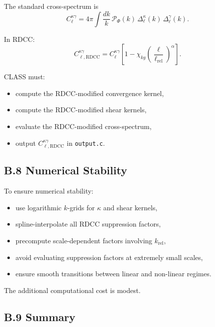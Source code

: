 \documentclass[11pt,a4paper]{article}
\begin{document}
The standard cross-spectrum is
\begin{equation}
    C_{\ell}^{\kappa\gamma}
    = 4\pi \int \frac{dk}{k}\,
      \mathcal{P}_{\Phi}(k)\,
      \Delta_{\ell}^{\kappa}(k)\,
      \Delta_{\ell}^{\gamma}(k).
\end{equation}

In RDCC:
\begin{equation}
    C_{\ell,\mathrm{RDCC}}^{\kappa\gamma}
    = C_{\ell}^{\kappa\gamma}
      \left[
        1 - \chi_{kg}
        \left(\frac{\ell}{\ell_{\mathrm{rel}}}\right)^{\alpha}
      \right].
\end{equation}

CLASS must:

\begin{itemize}
    \item compute the RDCC-modified convergence kernel,
    \item compute the RDCC-modified shear kernels,
    \item evaluate the RDCC-modified cross-spectrum,
    \item output $C_{\ell,\mathrm{RDCC}}^{\kappa\gamma}$ in \texttt{output.c}.
\end{itemize}

\subsection*{B.8 Numerical Stability}

To ensure numerical stability:

\begin{itemize}
    \item use logarithmic $k$-grids for $\kappa$ and shear kernels,
    \item spline-interpolate all RDCC suppression factors,
    \item precompute scale-dependent factors involving $k_{\mathrm{rel}}$,
    \item avoid evaluating suppression factors at extremely small scales,
    \item ensure smooth transitions between linear and non-linear regimes.
\end{itemize}

The additional computational cost is modest.

\subsection*{B.9 Summary}
\end{document}
